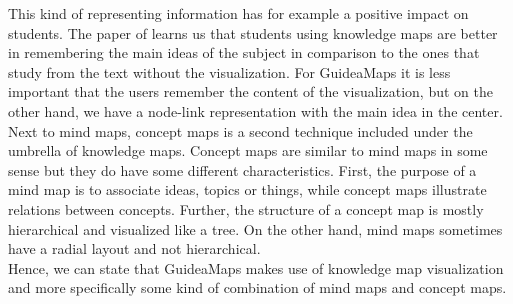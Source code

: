 This kind of representing information has for example a positive impact on students. The paper of \cite{knowledgemapsodonnell} learns us that students using knowledge maps are better in remembering the main ideas of the subject in comparison to the ones that study from the text without the visualization. For GuideaMaps it is less important that the users remember the content of the visualization, but on the other hand, we have a node-link representation with the main idea in the center.\\

Next to mind maps, concept maps is a second technique included under the umbrella of knowledge maps. Concept maps are similar to mind maps in some sense but they do have some different characteristics. First, the purpose of a mind map is to associate ideas, topics or things, while concept maps illustrate relations between concepts. Further, the structure of a concept map is mostly hierarchical and visualized like a tree. On the other hand, mind maps sometimes have a radial layout and not hierarchical. \citep{davies} \\

Hence, we can state that GuideaMaps makes use of knowledge map visualization and more specifically some kind of combination of mind maps and concept maps.